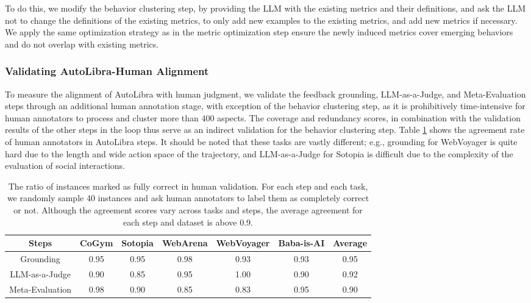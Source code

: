 
To do this, we modify the behavior clustering step, by providing the LLM with the existing metrics
and their definitions, and ask the LLM not to change the definitions of the existing metrics, 
to only add new examples to the existing metrics, and add new metrics if necessary.
We apply the same optimization strategy as in the metric optimization step
ensure the newly induced metrics cover emerging behaviors and do not overlap with existing metrics.

\subsubsection{Validating AutoLibra-Human Alignment}

To measure the alignment of AutoLibra with human judgment,
we validate the feedback grounding, LLM-as-a-Judge, and Meta-Evaluation steps through an additional human annotation stage, with exception of the behavior clustering step, as it is prohibitively time-intensive for human annotators to
process and cluster more than 400 aspects. The coverage and redundancy scores, in combination with the validation results of the other steps in the loop thus serve as an indirect validation for the behavior clustering step.
Table \ref{tab:validation} shows the agreement rate of human annotators in AutoLibra steps. 
It should be noted that these tasks are vastly different; e.g., grounding for WebVoyager \citep{he2024webvoyager} is quite hard
due to the length and wide action space of the trajectory, and LLM-as-a-Judge for Sotopia \citep{zhousotopia} is
difficult due to the complexity of the evaluation of social interactions. 

\begin{table}[!t]
    \centering
    \small
    \begin{tabular}{cccccc|c}
        \toprule
        Steps & CoGym & Sotopia & WebArena & WebVoyager & Baba-is-AI & Average  \\
        \midrule
        Grounding & 0.95 & 0.95 & 0.98 & 0.93 & 0.93 & 0.95 \\
        LLM-as-a-Judge & 0.90 & 0.85 & 0.95 & 1.00 & 0.90 & 0.92 \\
        Meta-Evaluation & 0.98 & 0.90 & 0.85 & 0.83 & 0.95 &  0.90 \\
        \bottomrule
    \end{tabular}
    \caption{
        The ratio of instances marked as fully correct in human validation. For each step and
        each task, we randomly sample 40 instances and ask human annotators to label them as completely correct
        or not. Although the agreement scores vary across tasks and steps, the average agreement for each
        step and dataset is above 0.9. 
}
    \label{tab:validation}
\end{table}


